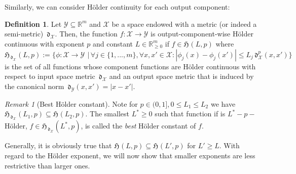 \documentclass{article} %
\theoremstyle{definition}
\newtheorem{defn}[thm]{Definition}
\theoremstyle{remark}
\newtheorem{remark}[thm]{Remark}
\newcommand{\abs}[1]{\left\vert#1\right\vert}
\newcommand{\Real}{\mathbb R}
\newcommand{\inspace}{\ensuremath{ \mathcal X}}
\newcommand{\outspace}{\ensuremath{ \mathcal Y}}
\newcommand{\metric}{\, \mathfrak{d}} %
\newcommand{\hoelset}[3]{\mathfrak{H}_{#2}(#1,#3)}
\begin{document}
Similarly, we can consider H\"older continuity for each output component: 

\begin{defn} \label{def:outputwisehoelder}
Let $\outspace \subseteq \Real^m $ and $\inspace$ be a space endowed with a metric (or indeed a semi-metric) $\metric_\inspace$. Then, the function $f: \inspace \to \outspace$ is output-component-wise H\"older continuous with exponent $p$ and constant $L \in \Real^m_{\geq 0}$ if $f \in \hoelset L { } p$ where
$\hoelset L {\metric_\inspace} p:= \bigl\{ \phi: \inspace \to \outspace \,\ | \, \forall j \in \{1,...,m \}, \forall x,x' \in \inspace: \abs{\phi_j(x) - \phi_j(x')} \leq L_j \metric^p_\inspace(x,x') \bigr\}$
is the set of all functions whose component functions are H\"older continuous with respect to input space metric $\metric_\inspace$ and an output space metric that is induced by the canonical norm $\metric_{\outspace} (x,x')= \abs{x-x'}$.  
\end{defn}

\begin{remark}[Best H\"older constant]
Note for $p \in (0,1], 0 \leq L_1 \leq L_2$ we have $\hoelset {L_1} {\metric_\inspace} p \subseteq \hoelset {L_2} { } p$. The smallest $L^* \geq 0$ such that function if is $L^*-p-$ H\"older, $f \in \hoelset {L^*} {\metric_\inspace} p$, is called the \emph{best} H\"older constant of $f$.
\end{remark}

Generally, it is obviously true that $\hoelset{L}{}{p} \subseteq \hoelset{L'}{}{p}$ for $L' \geq L$.
With regard to the H\"older exponent, we will now show that smaller exponents are less restrictive than larger ones. 
\end{document}
